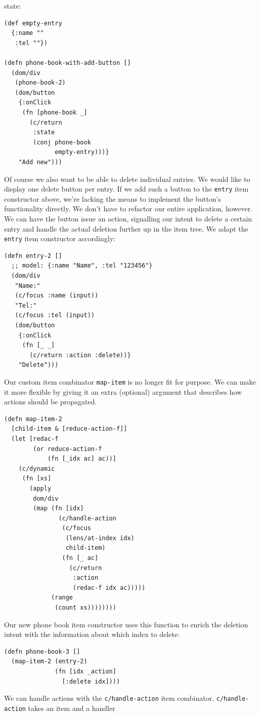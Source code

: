 \documentclass[sigplan,screen]{acmart}
\begin{document}
state:
%
\begin{verbatim}
(def empty-entry
  {:name ""
   :tel ""})

(defn phone-book-with-add-button []
  (dom/div
   (phone-book-2)
   (dom/button
    {:onClick
     (fn [phone-book _]
       (c/return
        :state
        (conj phone-book
              empty-entry)))}
    "Add new")))
\end{verbatim}
%
Of course we also want to be able to delete individual entries. We
would like to display one delete button per entry. If we add such a
button to the \texttt{entry} item constructor above, we're lacking the
means to implement the button's functionality directly. We don't have
to refactor our entire application, however. We can have the button
issue an action, signalling our intent to delete a certain entry and
handle the actual deletion further up in the item tree. We adapt the
\texttt{entry} item constructor accordingly:
%
\begin{verbatim}
(defn entry-2 []
  ;; model: {:name "Name", :tel "123456"}
  (dom/div
   "Name:"
   (c/focus :name (input))
   "Tel:"
   (c/focus :tel (input))
   (dom/button
    {:onClick
     (fn [_ _]
       (c/return :action :delete))}
    "Delete")))
\end{verbatim}
%
Our custom item combinator \texttt{map-item} is no longer fit for
purpose. We can make it more flexible by giving it an extra (optional)
argument that describes how actions should be propagated.
%
\begin{verbatim}
(defn map-item-2
  [child-item & [reduce-action-f]]
  (let [redac-f
        (or reduce-action-f
            (fn [_idx ac] ac))]
    (c/dynamic
     (fn [xs]
       (apply
        dom/div
        (map (fn [idx]
               (c/handle-action
                (c/focus
                 (lens/at-index idx)
                 child-item)
                (fn [_ ac]
                  (c/return
                   :action
                   (redac-f idx ac)))))
             (range
              (count xs))))))))
\end{verbatim}
%
Our new phone book item constructor uses this function to enrich the
deletion intent with the information about which index to delete:
%
\begin{verbatim}
(defn phone-book-3 []
  (map-item-2 (entry-2)
              (fn [idx _action]
                [:delete idx])))
\end{verbatim}
%
We can handle actions with the \texttt{c/handle-action} item
combinator. \texttt{c/handle-action} takes an item and a handler
\end{document}

